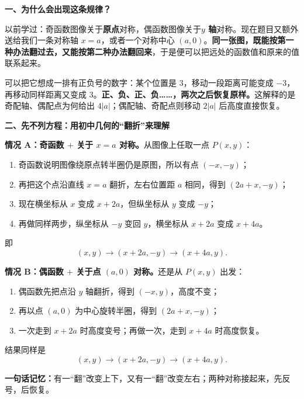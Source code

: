 \clearpage
\begin{explanationbox}
\textbf{\textcolor{CExplanation}{一、为什么会出现这条规律？}}



以前学过：奇函数图像关于\textbf{原点}对称，偶函数图像关于\textbf{$y$ 轴}对称。现在题目又额外送给我们一条对称轴 $x=a$，或者一个对称中心 $(a,0)$。\textbf{同一张图，既能按第一种办法翻过去，又能按第二种办法翻回来}，于是便可以把远处的函数值和原来的值联系起来。

可以把它想成一排有正负号的数字：某个位置是 $3$，移动一段距离可能变成 $-3$，再移动同样距离又变成 $3$。\textbf{正、负、正、负……，两次之后恢复原样。}这解释的是奇配轴、偶配点为何给出 $4|a|$；偶配轴、奇配点则移动 $2|a|$ 后高度直接恢复。

\medskip

\end{explanationbox}
\clearpage
\begin{explanationbox}
\textbf{\textcolor{CExplanation}{二、先不列方程：用初中几何的“翻折”来理解}}



\textbf{情况 A：奇函数 $+$ 关于 $x=a$ 对称。}从图像上任取一点 $P(x,y)$：
\begin{enumerate}[leftmargin=*,itemsep=0.25em]
 \item 奇函数说明图像绕原点转半圈仍是原图，所以有点 $(-x,-y)$；
 \item 再把这个点沿直线 $x=a$ 翻折，左右位置距 $a$ 相同，得到 $(2a+x,-y)$；
 \item 现在横坐标从 $x$ 变成 $x+2a$，但纵坐标从 $y$ 变成 $-y$；
 \item 再做同样两步，纵坐标从 $-y$ 变回 $y$，横坐标从 $x+2a$ 变成 $x+4a$。
\end{enumerate}
即
\[
(x,y)\longrightarrow(x+2a,-y)\longrightarrow(x+4a,y).
\]

\end{explanationbox}\clearpage\begin{explanationbox}

\textbf{情况 B：偶函数 $+$ 关于点 $(a,0)$ 对称。}还是从 $P(x,y)$ 出发：
\begin{enumerate}[leftmargin=*,itemsep=0.25em]
 \item 偶函数先把点沿 $y$ 轴翻折，得到 $(-x,y)$，高度不变；
 \item 再以点 $(a,0)$ 为中心旋转半圈，得到 $(2a+x,-y)$；
 \item 一次走到 $x+2a$ 时高度变号；再做一次，走到 $x+4a$ 时高度恢复。
\end{enumerate}
结果同样是
\[
(x,y)\longrightarrow(x+2a,-y)\longrightarrow(x+4a,y).
\]

\textbf{一句话记忆：}有一“翻”改变上下，又有一“翻”改变左右；两种对称接起来，先反号，后恢复。

\medskip

\end{explanationbox}
